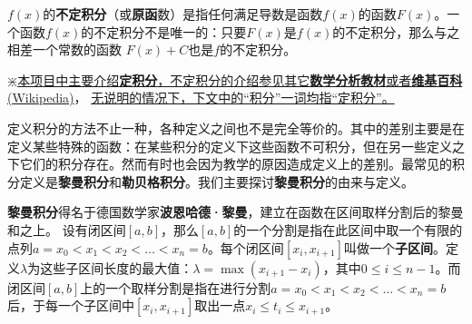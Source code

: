 \documentclass[UTF8]{ctexart}
\begin{document}
{$f(x)$的\textbf{不定积分}（或\textbf{原函}数）是指任何满足导数是函数$f(x)$的函数$F(x)$。一个函数$f(x)$的不定积分不是唯一的：只要$F(x)$是$f(x)$的不定积分，那么与之相差一个常数的函数 $F(x)+C$也是$f$的不定积分。

$\divideontimes$\underline{本项目中主要介绍\textbf{定积分}，不定积分的介绍参见其它\textbf{数学分析教材}或者\textbf{维基百科}(Wikipedia)}，
\underline{无说明的情况下，下文中的“积分”一词均指“定积分”。}
\begin{info}[Notice:]
定义积分的方法不止一种，各种定义之间也不是完全等价的。其中的差别主要是在定义某些特殊的函数：在某些积分的定义下这些函数不可积分，但在另一些定义之下它们的积分存在。然而有时也会因为教学的原因造成定义上的差别。最常见的积分定义是\textbf{黎曼积分}和\textbf{勒贝格积分}。我们主要探讨\textbf{黎曼积分}的由来与定义。
\end{info}

\textbf{黎曼积分}得名于德国数学家\textbf{波恩哈德·黎曼}，建立在函数在区间取样分割后的黎曼和之上。
设有闭区间$[a,b]$，那么$[a,b]$的一个分割是指在此区间中取一个有限的点列$a=x_{0}<x_{1}<x_{2}<\ldots <x_{n}=b$。每个闭区间$[x_{i},x_{i+1}]$叫做一个\textbf{子区间}。定义$\lambda$为这些子区间长度的最大值：$\lambda =\max(x_{i+1}-x_{i})$，其中$0 \leqslant i \leqslant n-1$。而闭区间$[a,b]$上的一个取样分割是指在进行分割$a=x_{0}<x_{1}<x_{2}<\ldots <x_{n}=b$后，于每一个子区间中$[x_{i},x_{i+1}]$取出一点$x_{i}\leq t_{i}\leq x_{i+1}$。

}
\end{document}
